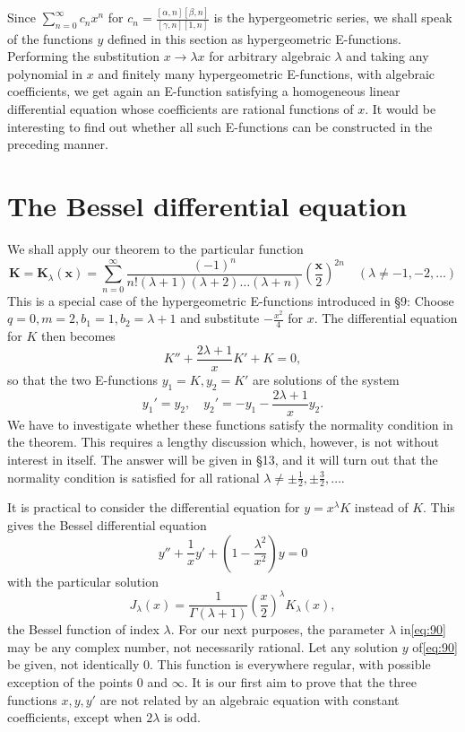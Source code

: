 Since $\sum_{n=0}^{\infty} c_n x^n$ for $c_n = \frac{[\alpha, n][\beta, n]}{[\gamma, n][1, n]}$ is the hypergeometric series, we shall speak of the functions $y$ defined in this section as hypergeometric E-functions. Performing the substitution $x \to \lambda x$ for arbitrary algebraic $\lambda$ and taking any polynomial in $x$ and finitely many hypergeometric E-functions, with algebraic coefficients, we get again an E-function satisfying a homogeneous linear differential equation whose coefficients are rational functions of $x$. It would be interesting to find out whether all such E-functions can be constructed in the preceding manner.

\section{The Bessel differential equation}\label{sec:10}

We shall apply our theorem to the particular function
\begin{equation}
\mathbf{K} = \mathbf{K}_{\lambda} (\mathbf{x}) = \sum_{n=0}^{\infty} \frac{(-1)^n}{n! (\lambda + 1)(\lambda + 2) \dots (\lambda + n)} \left(\frac{\mathbf{x}}{2}\right)^{2n} \quad (\lambda \neq -1, -2, \dots) \tag{89}\label{eq:89}
\end{equation}
This is a special case of the hypergeometric E-functions introduced in \S 9: Choose $q=0, m=2, b_1=1, b_2=\lambda+1$ and substitute $-\frac{x^2}{4}$ for $x$. The differential equation for $K$ then becomes
\[K'' + \frac{2\lambda + 1}{x} K' + K = 0,\]
so that the two E-functions $y_1 = K, y_2 = K'$ are solutions of the system
\[y_1' = y_2, \quad y_2' = -y_1 - \frac{2\lambda + 1}{x} y_2.\]
We have to investigate whether these functions satisfy the normality condition in the theorem. This requires a lengthy discussion which, however, is not without interest in itself. The answer will be given in \S 13, and it will turn out that the normality condition is satisfied for all rational $\lambda \neq \pm \frac{1}{2}, \pm \frac{3}{2}, \dots.$

It is practical to consider the differential equation for $y = x^\lambda K$ instead of $K$. This gives the Bessel differential equation
\begin{equation}
y'' + \frac{1}{x} y' + \left(1 - \frac{\lambda^2}{x^2}\right)y = 0 \tag{90}\label{eq:90}
\end{equation}
with the particular solution
\begin{equation}
J_{\lambda}(x) = \frac{1}{\Gamma(\lambda+1)} \left(\frac{x}{2}\right)^{\lambda} K_{\lambda}(x), \tag{91}\label{eq:91}
\end{equation}
the Bessel function of index $\lambda$. For our next purposes, the parameter $\lambda$ in\eqref{eq:90} may be any complex number, not necessarily rational. Let any solution $y$ of\eqref{eq:90} be given, not identically 0. This function is everywhere regular, with possible exception of the points $0$ and $\infty$. It is our first aim to prove that the three functions $x, y, y'$ are not related by an algebraic equation with constant coefficients, except when $2\lambda$ is odd.

